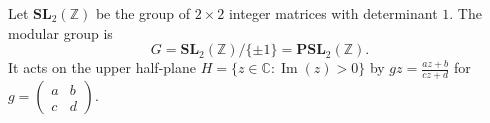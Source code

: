 Let $\mathbf{SL}_2(\mathbb{Z})$ be the group of $2 \times 2$ integer matrices with determinant $1$. The modular group is
$$G = \mathbf{SL}_2(\mathbb{Z})/\{\pm 1\} = \mathbf{PSL}_2(\mathbb{Z}).$$
It acts on the upper half-plane $H = \{z \in \mathbb{C} : \operatorname{Im}(z) > 0\}$ by $gz = \frac{az+b}{cz+d}$ for $g = \begin{pmatrix}a&b\\c&d\end{pmatrix}$.
